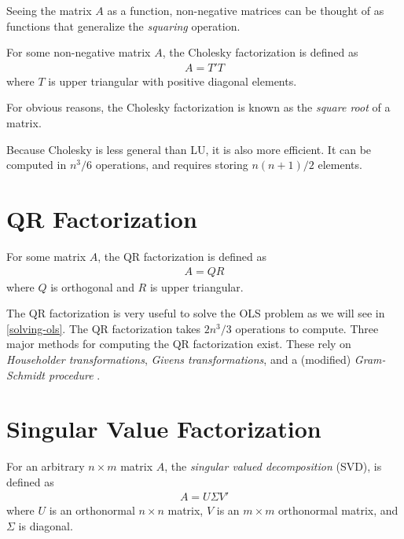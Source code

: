 \documentclass[]{book}
\theoremstyle{definition}
\theoremstyle{definition}
\theoremstyle{definition}
\theoremstyle{remark}
\let\BeginKnitrBlock\begin \let\EndKnitrBlock\end
\begin{document}
Seeing the matrix \(A\) as a function, non-negative matrices can be thought of as functions that generalize the \emph{squaring} operation.

\BeginKnitrBlock{definition}[Cholesky Factorization]
\protect\hypertarget{def:cholesky}{}{\label{def:cholesky} {} }For some non-negative matrix \(A\), the Cholesky factorization is defined as
\begin{align}
 A = T' T 
\end{align}
where \(T\) is upper triangular with positive diagonal elements.
\EndKnitrBlock{definition}

For obvious reasons, the Cholesky factorization is known as the \emph{square root} of a matrix.

Because Cholesky is less general than LU, it is also more efficient.
It can be computed in \(n^3/6\) operations, and requires storing \(n(n+1)/2\) elements.

\hypertarget{qr-factorization}{%
\section{QR Factorization}\label{qr-factorization}}

\BeginKnitrBlock{definition}[QR Factorization]
\protect\hypertarget{def:qr}{}{\label{def:qr} {} }For some matrix \(A\), the QR factorization is defined as
\begin{align}
 A = Q R 
\end{align}
where \(Q\) is orthogonal and \(R\) is upper triangular.
\EndKnitrBlock{definition}

The QR factorization is very useful to solve the OLS problem as we will see in \ref{solving-ols}.
The QR factorization takes \(2n^3/3\) operations to compute.
Three major methods for computing the QR factorization exist. These rely on \emph{Householder transformations}, \emph{Givens transformations}, and a (modified) \emph{Gram-Schmidt procedure} \citep{gentle2012numerical}.

\hypertarget{singular-value-factorization}{%
\section{Singular Value Factorization}\label{singular-value-factorization}}

\BeginKnitrBlock{definition}[SVD]
\protect\hypertarget{def:svd}{}{\label{def:svd} {} }For an arbitrary \(n\times m\) matrix \(A\), the \emph{singular valued decomposition} (SVD), is defined as \begin{align}
 A = U \Sigma V' 
\end{align}
where \(U\) is an orthonormal \(n \times n\) matrix, \(V\) is an \(m \times m\) orthonormal matrix, and \(\Sigma\) is diagonal.
\EndKnitrBlock{definition}
\end{document}
